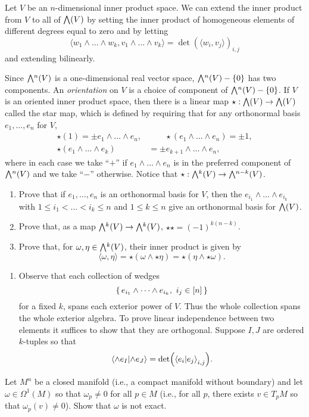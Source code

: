 \documentclass[12pt]{memoir}
\begin{document}
\begin{Ej}
    Let $V$ be an $n$-dimensional inner product space. We can extend the inner product from $V$ to all of $\exterior(V)$ by setting the inner product of homogeneous elements of different degrees equal to zero and by letting
	\[
		\langle w_1 \wedge \ldots \wedge w_k, v_1 \wedge \ldots \wedge v_k \rangle = \det \left(\langle w_i, v_j \rangle \right)_{i,j}
	\]
	and extending bilinearly. 
	
	Since $\exterior^n(V)$ is a one-dimensional real vector space, $\exterior^n(V) - \{0\}$ has two components. An \emph{orientation} on $V$ is a choice of component of $\exterior^n(V) - \{0\}$. If $V$ is an oriented inner product space, then there is a linear map $\star: \exterior(V) \to \exterior(V)$ called the star map, which is defined by requiring that for any orthonormal basis $e_1, \ldots , e_n$ for $V$,
	\begin{align*}
		\star(1) = \pm e_1 \wedge \ldots \wedge e_n,  & \qquad \star(e_1 \wedge \ldots \wedge e_n) = \pm 1, \\
		\star(e_1 \wedge \ldots \wedge e_k) & = \pm e_{k+1} \wedge \ldots \wedge e_n,
	\end{align*}
	where in each case we take ``$+$'' if $e_1 \wedge \ldots \wedge e_n$ is in the preferred component of $\exterior^n(V)$ and we take ``$-$'' otherwise. Notice that $\star: \exterior^k(V) \to \exterior^{n-k}(V)$.
	
	\begin{enumerate}
		\item Prove that if $e_1, \ldots , e_n$ is an orthonormal basis for $V$, then the $e_{i_1} \wedge \ldots \wedge e_{i_k}$ with $1 \leq i_1 < \ldots < i_k \leq n$ and $1 \leq k \leq n$ give an orthonormal basis for $\exterior(V)$.
		\item Prove that, as a map $\exterior^k(V) \to \exterior^k(V)$, $\star \star = (-1)^{k(n-k)}$.
		\item Prove that, for $\omega, \eta \in \exterior^k(V)$, their inner product is given by
		\[
			\langle \omega, \eta \rangle = \star (\omega \wedge \star \eta) = \star(\eta \wedge \star \omega).
		\]
	\end{enumerate}
\end{Ej}
\begin{ptcbr}
    \begin{enumerate}
        \item Observe that each collection of wedges
        $$\set{e_{i_1}\wyw e_{i_k},\ i_j\in\bonj{n}}$$
        for a fixed $k$, spans each exterior power of $V$. Thus the whole collection spans the whole exterior algebra. To prove linear independence between two elements it suffices to show that they are orthogonal. Suppose $I,J$ are ordered $k$-tuples so that 
        $$\braket{\wedge e_I}{\wedge e_J}=\det(\braket{e_i}{e_j}_{i,j}).$$ 
    \end{enumerate}
\end{ptcbr}
\begin{Ej}
    Let $M^n$ be a closed manifold (i.e., a compact manifold without boundary) and let $\omega \in \Omega^1(M)$ so that $\omega_p \neq 0$ for all $p \in M$ (i.e., for all $p$, there exists $v \in T_pM$ so that $\omega_p(v) \neq 0$). Show that $\omega$ is not exact.
\end{Ej}
\end{document}
